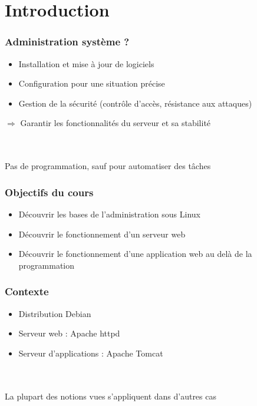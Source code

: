 \section*{Introduction}

\begin{frame}
	\frametitle{Administration système ?}
	
	\begin{itemize}
		\item Installation et mise à jour de logiciels
		\item Configuration pour une situation précise
		\item Gestion de la sécurité (contrôle d'accès, résistance aux attaques)
	\end{itemize}
    $\Rightarrow$ Garantir les fonctionnalités du serveur et sa stabilité

    ~\\
	~\\	
	
	Pas de programmation, sauf pour automatiser des tâches

\end{frame}

\begin{frame}
	\frametitle{Objectifs du cours}
	
	\begin{itemize}
		\item Découvrir les bases de l'administration sous Linux
		\item Découvrir le fonctionnement d'un serveur web
		\item Découvrir le fonctionnement d'une application web au delà de la programmation
	\end{itemize}
\end{frame}

\begin{frame}
	\frametitle{Contexte}
	
	\begin{itemize}
		\item Distribution Debian
		\item Serveur web : Apache httpd
		\item Serveur d'applications : Apache Tomcat
	\end{itemize}
	
	~\\
	~\\	
	La plupart des notions vues s'appliquent dans d'autres cas
\end{frame}
